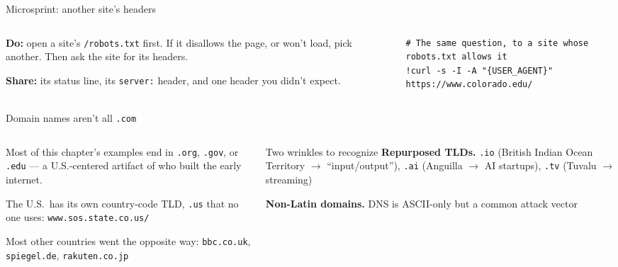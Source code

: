 \documentclass[9pt,aspectratio=169]{beamer}
\begin{document}
\begin{frame}[fragile]{Microsprint: another site's headers}
    \begin{columns}[T]
        \begin{column}{0.37\textwidth}
            \textbf{Do:} open a site's \texttt{/robots.txt} first. If it disallows the page, or won't load, pick another. Then ask the site for its headers.

            \medskip
            \textbf{Share:} its status line, its \texttt{server:} header, and one header you didn't expect.
        \end{column}
        \begin{column}{0.6\textwidth}
\begin{lstlisting}[style=lab]
# The same question, to a site whose robots.txt allows it
!curl -s -I -A "{USER_AGENT}" https://www.colorado.edu/
\end{lstlisting}
        \end{column}
    \end{columns}
\end{frame}

\begin{frame}{Domain names aren't all \texttt{.com}}
    \begin{columns}[T]
        \begin{column}{0.55\textwidth}
            Most of this chapter's examples end in \texttt{.org}, \texttt{.gov}, or \texttt{.edu} --- a U.S.-centered artifact of who built the early internet.

            \bigskip

            The U.S.\ has its own country-code TLD, \texttt{.us} that no one uses: \texttt{www.sos.state.co.us/}

            \bigskip
            
            \bigskip
            Most other countries went the opposite way: \texttt{bbc.co.uk}, \texttt{spiegel.de}, \texttt{rakuten.co.jp}
        \end{column}
        \begin{column}{0.4\textwidth}
            \begin{block}{Two wrinkles to recognize}
                \footnotesize
                \textbf{Repurposed TLDs.} \texttt{.io} (British Indian Ocean Territory $\to$ ``input/output''), \texttt{.ai} (Anguilla $\to$ AI startups), \texttt{.tv} (Tuvalu $\to$ streaming)

                \medskip

                \textbf{Non-Latin domains.} DNS is ASCII-only but a common attack vector
            \end{block}
        \end{column}
    \end{columns}
\end{frame}
\end{document}
